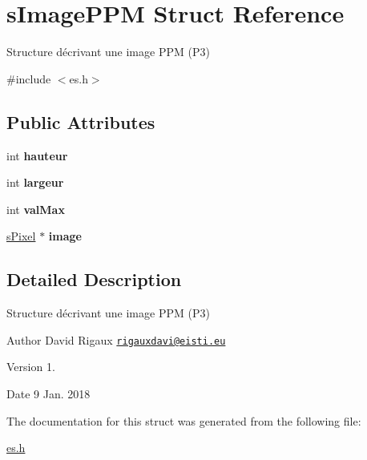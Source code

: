 \hypertarget{structs_image_p_p_m}{}\section{s\+Image\+P\+PM Struct Reference}
\label{structs_image_p_p_m}


Structure décrivant une image P\+PM (P3)  




{\ttfamily \#include $<$es.\+h$>$}

\subsection*{Public Attributes}
\begin{DoxyCompactItemize}
\item 
\mbox{\label{structs_image_p_p_m_ab8a1c207163cb1395526a72bfb5a32f8}} 
int {\bfseries hauteur}
\item 
\mbox{\label{structs_image_p_p_m_a5e213de573190dc7c00856fcf8c0b247}} 
int {\bfseries largeur}
\item 
\mbox{\label{structs_image_p_p_m_a411562506066f8659591ea2a067e447a}} 
int {\bfseries val\+Max}
\item 
\mbox{\label{structs_image_p_p_m_a1732f2223db8fad05d9c1c729ff8bd1d}} 
\mbox{\hyperlink{structs_pixel}{s\+Pixel}} $\ast$ {\bfseries image}
\end{DoxyCompactItemize}


\subsection{Detailed Description}
Structure décrivant une image P\+PM (P3) 

\begin{DoxyAuthor}{Author}
David Rigaux \href{mailto:rigauxdavi@eisti.eu}{\tt rigauxdavi@eisti.\+eu} 
\end{DoxyAuthor}
\begin{DoxyVersion}{Version}
1. 
\end{DoxyVersion}
\begin{DoxyDate}{Date}
9 Jan. 2018 
\end{DoxyDate}


The documentation for this struct was generated from the following file\+:\begin{DoxyCompactItemize}
\item 
\mbox{\hyperlink{es_8h}{es.\+h}}\end{DoxyCompactItemize}
